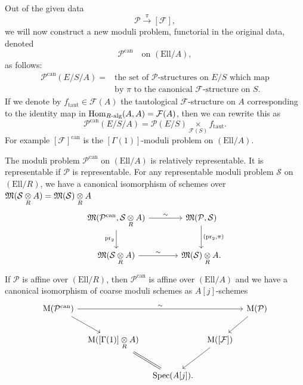 \kmitem\label{item:9.1.6}
Out of the given data
\[
\mathcal{P} \xrightarrow{\ \pi\ } [\mathcal{F}] ,
\]
we will now construct a new moduli problem, functorial in the original data, denoted
\begin{equation}\label{eq:9.1.6.1}
\mathcal{P}^{\mathrm{can}} \quad \text{on } (\mathrm{Ell}/A) ,
\end{equation}
as follows:
\begin{equation}\label{eq:9.1.6.2}
\begin{aligned}
\mathcal{P}^{\mathrm{can}}(E/S/A) = {} & \text{the set of } \mathcal{P}\text{-structures on } E/S \text{ which map} \\
& \text{by } \pi \text{ to the canonical } \mathcal{F}\text{-structure on } S .
\end{aligned}
\end{equation}
If we denote by $f_{\mathrm{taut}} \in \mathcal{F}(A)$ the tautological $\mathcal{F}$-structure on $A$ corresponding to the identity map in $\operatorname{Hom}_{R\text{-alg}}(A, A) = \mathcal{F}(A)$, then we can rewrite this as
\[
\mathcal{P}^{\mathrm{can}}(E/S/A) = \mathcal{P}(E/S) \underset{\mathcal{F}(S)}{\times} f_{\mathrm{taut}} .
\]
For example $[\mathcal{F}]^{\mathrm{can}}$ is the $[\Gamma(1)]$-moduli problem on $(\mathrm{Ell}/A)$.

\begin{kprop}\label{prop:9.1.7}
The moduli problem $\mathcal{P}^{\mathrm{can}}$ on $(\mathrm{Ell}/A)$ is relatively representable. It is representable if $\mathcal{P}$ is representable. For any representable moduli problem $\mathcal{S}$ on $(\mathrm{Ell}/R)$, we have a canonical isomorphism of schemes over $\mathfrak{M}(\mathcal{S} \underset{R}{\otimes} A) = \mathfrak{M}(\mathcal{S}) \underset{R}{\otimes} A$
\begin{equation*}
\begin{tikzcd}[row sep=2.2em, column sep=3.5em]
\Mfrak(\mathcal{P}^{\mathrm{can}}, \mathcal{S} \tens{R} A) \arrow[r, "\sim"] \arrow[d, "\mathrm{pr}_2"'] & \Mfrak(\mathcal{P}, \mathcal{S}) \arrow[d, "{(\mathrm{pr}_2, \pi)}"] \\
\Mfrak(\mathcal{S} \tens{R} A) \arrow[r, "\sim"] & \Mfrak(\mathcal{S}) \tens{R} A .
\end{tikzcd}
\end{equation*}
If $\mathcal{P}$ is affine over $(\mathrm{Ell}/R)$, then $\mathcal{P}^{\mathrm{can}}$ is affine over $(\mathrm{Ell}/A)$ and we have a canonical isomorphism of coarse moduli schemes as $A[j]$-schemes
\begin{equation*}
\begin{tikzcd}[row sep=2.0em, column sep=0.8em]
\Mcoarse(\mathcal{P}^{\mathrm{can}}) \arrow[rrrr, "\sim"] \arrow[rd] & & & & \Mcoarse(\mathcal{P}) \arrow[ld] \\
& \Mcoarse([\Gamma(1)] \tens{R} A) \arrow[rd, equal] & & \Mcoarse([\mathcal{F}]) \arrow[ld] & \\
& & \Spec(A[j]) . & &
\end{tikzcd}
\end{equation*}
\end{kprop}


